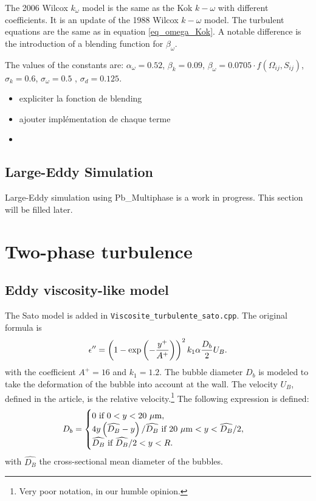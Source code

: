 The 2006 Wilcox $k_\omega$ model \cite{Wilcox2006} is the same as the Kok $k-\omega$ with different coefficients. It is an update of the 1988 Wilcox $k-\omega$ model. The turbulent equations are the same as in equation \ref{eq_omega_Kok}. A notable difference is the introduction of a blending function for $\beta_{\omega}$.

The values of the constants are: $\alpha_{\omega} = 0.52$, $\beta_{k} = 0.09$, $\beta_{\omega} = 0.0705\cdot f(\Omega_{ij},S_{ij})$, $\sigma_k = 0.6$, $\sigma_{\omega} = 0.5$ , $\sigma_d = 0.125$.

\begin{itemize}
    \item expliciter la fonction de blending
    \item ajouter implémentation de chaque terme
    \item
\end{itemize}

\subsection{Large-Eddy Simulation}

Large-Eddy simulation using Pb_Multiphase is a work in progress. This section will be filled later.

\section{Two-phase turbulence}

\subsection{Eddy viscosity-like model}

The Sato model \cite{Sato1981a} is added in \texttt{Viscosite_turbulente_sato.cpp}. The original formula is
\begin{equation}
\epsilon''=\left( 1-\exp\left( -\frac{y^+}{A^+} \right) \right)^2 k_1 \alpha \frac{D_b}{2}U_B.
\end{equation}
with the coefficient $A^+=16$ and $k_1 = 1.2$. The bubble diameter $D_b$ is modeled to take the deformation of the bubble into account at the wall. The velocity $U_B$, defined in the article, is the relative velocity.\footnote{Very poor notation, in our humble opinion.} The following expression is defined:
\begin{equation}
    D_b = \begin{cases}
    0\ \text{if}\ 0 < y < 20~\unit{\mu m},\\
    4y\parent{\widehat{D_B}-y}/\widehat{D_B}\ \text{if}\ 20~\unit{\mu m} < y < \widehat{D_B}/2,\\
    \widehat{D_B}\ \text{if}\ \widehat{D_B}/2 < y < R.
    \end{cases}
\end{equation}
with $\widehat{D_B}$ the cross-sectional mean diameter of the bubbles.

